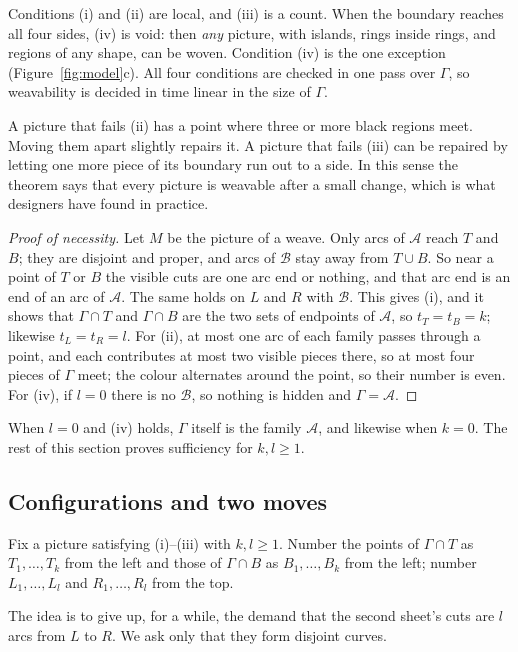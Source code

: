 \documentclass[11pt,a4paper]{article}
\theoremstyle{definition}
\theoremstyle{remark}
\newcommand{\A}{\mathcal{A}}
\newcommand{\B}{\mathcal{B}}
\begin{document}
Conditions (i) and (ii) are local, and (iii) is a count. When the boundary
reaches all four sides, (iv) is void: then \emph{any} picture, with islands,
rings inside rings, and regions of any shape, can be woven. Condition (iv)
is the one exception (Figure~\ref{fig:model}c). All four conditions are
checked in one pass over $\Gamma$, so weavability is decided in time linear
in the size of $\Gamma$.

A picture that fails (ii) has a point where three or more black regions
meet. Moving them apart slightly repairs it. A picture that fails (iii) can
be repaired by letting one more piece of its boundary run out to a side.
In this sense the theorem says that every picture is weavable after a small
change, which is what designers have found in practice.

\begin{proof}[Proof of necessity]
Let $M$ be the picture of a weave. Only arcs of $\A$ reach $T$ and $B$; they
are disjoint and proper, and arcs of $\B$ stay away from $T\cup B$. So near
a point of $T$ or $B$ the visible cuts are one arc end or nothing, and that
arc end is an end of an arc of $\A$. The same holds on $L$ and $R$ with
$\B$. This gives (i), and it shows that $\Gamma\cap T$ and $\Gamma\cap B$
are the two sets of endpoints of $\A$, so $t_T=t_B=k$; likewise
$t_L=t_R=l$. For (ii), at most one arc of each family passes through a
point, and each contributes at most two visible pieces there, so at most
four pieces of $\Gamma$ meet; the colour alternates around the point, so
their number is even. For (iv), if $l=0$ there is no $\B$, so nothing is
hidden and $\Gamma=\A$.
\end{proof}

When $l=0$ and (iv) holds, $\Gamma$ itself is the family $\A$, and likewise
when $k=0$. The rest of this section proves sufficiency for $k,l\ge 1$.

\subsection{Configurations and two moves}

Fix a picture satisfying (i)--(iii) with $k,l\ge1$. Number the points of
$\Gamma\cap T$ as $T_1,\dots,T_k$ from the left and those of $\Gamma\cap B$
as $B_1,\dots,B_k$ from the left; number $L_1,\dots,L_l$ and
$R_1,\dots,R_l$ from the top.

The idea is to give up, for a while, the demand that the second sheet's cuts
are $l$ arcs from $L$ to $R$. We ask only that they form disjoint curves.
\end{document}
